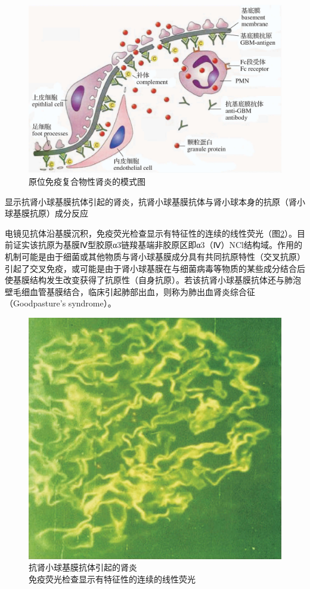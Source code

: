 \begin{figure}[!htbp]
 \centering
 \includegraphics{./images/Image00147.jpg}
 \captionsetup{justification=centering}
 \caption{原位免疫复合物性肾炎的模式图}
 \label{fig10-1}
  \end{figure} 

显示抗肾小球基膜抗体引起的肾炎，抗肾小球基膜抗体与肾小球本身的抗原（肾小球基膜抗原）成分反应

电镜见抗体沿基膜沉积，免疫荧光检查显示有特征性的连续的线性荧光（图\ref{fig10-2}）。目前证实该抗原为基膜Ⅳ型胶原α3链羧基端非胶原区即α3（Ⅳ）NCl结构域。作用的机制可能是由于细菌或其他物质与肾小球基膜成分具有共同抗原特性（交叉抗原）引起了交叉免疫，或可能是由于肾小球基膜在与细菌病毒等物质的某些成分结合后使基膜结构发生改变获得了抗原性（自身抗原）。若该抗肾小球基膜抗体还与肺泡壁毛细血管基膜结合，临床引起肺部出血，则称为肺出血肾炎综合征（Goodpasture's
syndrome）。

\begin{figure}[!htbp]
 \centering
 \includegraphics{./images/Image00148.jpg}
 \captionsetup{justification=centering}
 \caption{抗肾小球基膜抗体引起的肾炎\\ {\small 免疫荧光检查显示有特征性的连续的线性荧光}}
\label{fig10-2}
  \end{figure}

